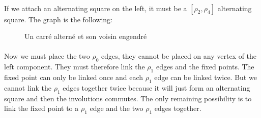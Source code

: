 \paragraph{}
If we attach an alternating square on the left, it must be a $[\rho_2, \rho_4]$ alternating square. The graph is the following:

\begin{figure}[H]
  \begin{center}
    \caption{Un carré alterné et son voisin engendré}
  \end{center}
\end{figure}

\paragraph{}
Now we must place the two $\rho_0$ edges, they cannot be placed on any vertex of the left component. They must therefore link the $\rho_1$ edges and the fixed points. The fixed point can only be linked once and each $\rho_1$ edge can be linked twice. But we cannot link the $\rho_1$ edges together twice because it will just form an alternating square and then the involutions commutes. The only remaining possibility is to link the fixed point to a $\rho_1$ edge and the two $\rho_1$ edges together.


